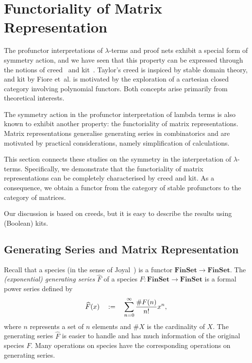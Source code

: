 \section{Functoriality of Matrix Representation}
The profunctor interpretations of \( \lambda \)-terms and proof nets exhibit a special form of symmetry action, and we have seen that this property can be expressed through the notions of creed~\cite{Taylor1989} and kit~\cite{Fiore2024}.
Taylor's creed is inspiced by stable domain theory, and kit by Fiore et~al.{} is motivated by the exploration of a cartesian closed category involving polynomial functors.
Both concepts arise primarily from theoretical interests.

The symmetry action in the profunctor interpretation of lambda terms is also known to exhibit another property: the functoriality of matrix representations. Matrix representations generalise generating series in combinatorics and are motivated by practical considerations, namely simplification of calculations.

This section connects these studies on the symmetry in the interpretation of \( \lambda \)-terms.
Specifically, we demonstrate that the functoriality of matrix representations can be completely characterised by creed and kit.
As a consequence, we obtain a functor from the category of stable profunctors to the category of matrices.

Our discussion is based on creeds, but it is easy to describe the results using (Boolean) kits.


\newcommand{\MatTrans}[1]{\mathcal{M}({#1})}
\newcommand{\rsem}[1]{(\!|{#1}|\!)}
\newcommand{\SProf}{\mathbf{SProf}}
\newcommand{\WRel}{\mathbf{WRel}}



\tk{to do: define \( \SProf_\omega \)}



\subsection{Generating Series and Matrix Representation}
\newcommand{\FinSet}{\mathbf{FinSet}}

Recall that a species (in the sense of Joyal~\cite{Joyal1983?}) is a functor \( \FinSet \longrightarrow \FinSet \).
The \emph{(exponential) generating series} \( \widehat{F} \) of a species \( F \colon \FinSet \longrightarrow \FinSet \) is a formal power series defined by
\begin{equation*}
    \widehat{F}(x)
    \quad:=\quad
    \sum_{n = 0}^{\infty} \dfrac{\# F(n)}{n!} x^n,
\end{equation*}
where \( n \) represents a set of \( n \) elements and \( \# X \) is the cardinality of \( X \).
The generating series \( \widehat{F} \) is easier to handle and has much information of the original species \( F \).
Many operations on species have the corresponding operations on generating series.


